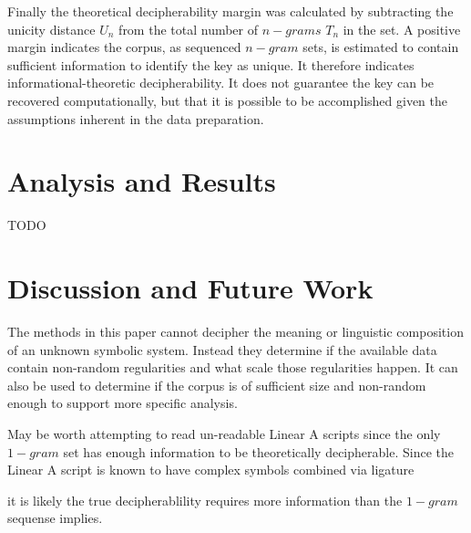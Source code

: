 \documentclass[preprint,12pt]{elsarticle}
\begin{document}
Finally the theoretical decipherability margin was calculated by subtracting the unicity distance \(U_n\) from the total number of \(n-grams\) \(T_n\) in the set. A positive margin indicates the corpus, as sequenced \(n-gram\) sets, is estimated to contain sufficient information to identify the key as unique. It therefore indicates informational-theoretic decipherability. It does not guarantee the key can be recovered computationally, but that it is possible to be accomplished given the assumptions inherent in the data preparation. 

\section{Analysis and Results} 
\label{anal_results}
TODO
\section{Discussion and Future Work}
\label{discussion}

The methods in this paper cannot decipher the meaning or linguistic composition of an unknown symbolic system. Instead they determine if the available data contain non-random regularities and what scale those regularities happen. It can also be used to determine if the corpus is of sufficient size and non-random enough to support more specific analysis. 

May be worth attempting to read un-readable Linear A scripts since the only \(1-gram\) set has enough information to be theoretically decipherable. Since the Linear A script is known to have complex symbols combined via ligature \cite{salgarella2021_sigla} 

it is likely the true decipherablility requires more information than the \(1-gram\) sequense implies. 
\newpage 
\appendix
\end{document}
